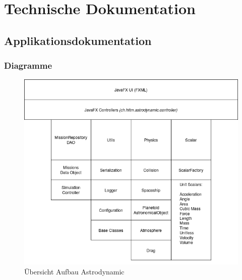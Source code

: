 \chapter{Technische Dokumentation}

\section{Applikationsdokumentation}

\subsection{Diagramme}

\begin{figure}[H]
	\centering
	\includegraphics[width=12cm]{res/overview.png}
	\caption{Übersicht Aufbau Astrodynamic}
\end{figure}

